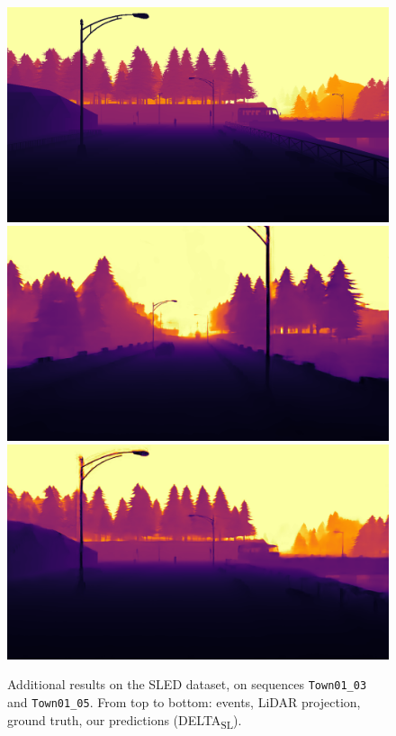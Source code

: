 \begin{figure}
  \includegraphics[width=0.475\linewidth]{mainmatter/figures/c_depth_transf/sled_dense_cmp_additional/data_and_gt/gtprev000994.png}\\
  \includegraphics[width=0.475\linewidth]{mainmatter/figures/c_depth_transf/sled_dense_cmp_additional/delta/predbf000750.png}
  \includegraphics[width=0.475\linewidth]{mainmatter/figures/c_depth_transf/sled_dense_cmp_additional/delta/predbf000994.png}
  \cprotect\caption{Additional results on the SLED dataset, on sequences \verb|Town01_03| and \verb|Town01_05|. From top to bottom: events, LiDAR projection, ground truth, our predictions (DELTA\textsubscript{SL}).}\label{fig:appendix:delta:cmp_sled_additional_good_0}
\end{figure}

